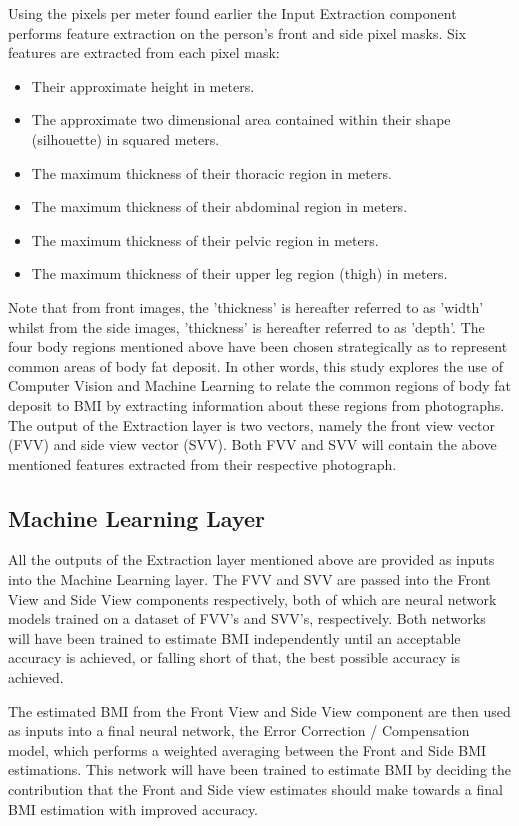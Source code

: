 \documentclass[conference]{IEEEtran}
\begin{document}
Using the pixels per meter found earlier the Input Extraction component performs feature extraction on the person's front and side pixel masks.
Six features are extracted from each pixel mask:
\begin{itemize}
	\item Their approximate height in meters.
	\item The approximate two dimensional area contained within their shape (silhouette) in squared meters.
	\item The maximum thickness of their thoracic region in meters.
	\item The maximum thickness of their abdominal region in meters.
	\item The maximum thickness of their pelvic region in meters.
	\item The maximum thickness of their upper leg region (thigh) in meters.	
\end{itemize}
Note that from front images, the 'thickness' is hereafter referred to as 'width' whilst from the side images, 'thickness' is hereafter referred to as 'depth'.
The four body regions mentioned above have been chosen strategically as to represent common areas of body fat deposit.
In other words, this study explores the use of Computer Vision and Machine Learning to relate the common regions of body fat deposit to BMI by extracting information about these regions from photographs.
The output of the Extraction layer is two vectors, namely the front view vector (FVV) and side view vector (SVV).
Both FVV and SVV will contain the above mentioned features extracted from their respective photograph.

\subsection{Machine Learning Layer}
All the outputs of the Extraction layer mentioned above are provided as inputs into the Machine Learning layer.
The FVV and SVV are passed into the Front View and Side View components respectively, both of which are neural network models trained on a dataset of FVV's and SVV's, respectively.
Both networks will have been trained to estimate BMI independently until an acceptable accuracy is achieved, or falling short of that, the best possible accuracy is achieved.

The estimated BMI from the Front View and Side View component are then used as inputs into a final neural network, the Error Correction / Compensation model, which performs a weighted averaging between the Front and Side BMI estimations.
This network will have been trained to estimate BMI by deciding the contribution that the Front and Side view estimates should make towards a final BMI estimation with improved accuracy.
\end{document}
